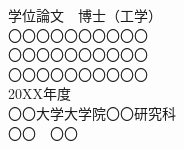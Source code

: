 \begin{titlepage}
    \begin{center}
        {\LARGE 学位論文　博士（工学）}\\
        \vspace{3cm}
        {\LARGE 〇〇〇〇〇〇〇〇〇〇} \\[5mm]
        {\LARGE 〇〇〇〇〇〇〇〇〇〇} \\[5mm]
        {\LARGE 〇〇〇〇〇〇〇〇〇〇} \\
        \vspace{3cm}
        {\LARGE 20XX年度} \\
        \vspace{8cm}
        {\LARGE 〇〇大学大学院〇〇研究科} \\
        \vspace{2cm}
        {\LARGE 〇〇　〇〇} \\
    \end{center}
\end{titlepage}
    